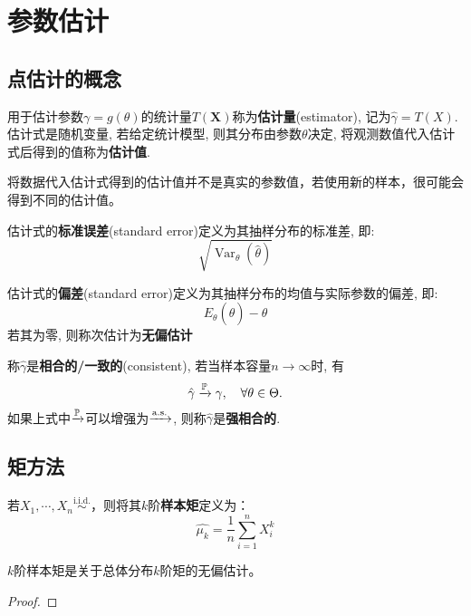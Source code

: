 \chapter{参数估计}

\section{点估计的概念}

\begin{definition}[点估计]
    用于估计参数$\gamma = g(\theta)$的统计量$T(\mathbf{X})$称为\textbf{估计量}(estimator), 记为$\hat{\gamma} = T(X)$. 估计式是随机变量, 若给定统计模型, 则其分布由参数$\theta$决定, 将观测数值代入估计式后得到的值称为\textbf{估计值}.
\end{definition}

将数据代入估计式得到的估计值并不是真实的参数值，若使用新的样本，很可能会得到不同的估计值。

\begin{definition}[标准误差]
    估计式的\textbf{标准误差}(standard error)定义为其抽样分布的标准差, 即:
    \[ \sqrt{\operatorname{Var}_{\theta}(\hat{\theta})} \]
\end{definition}

\begin{definition}[无偏估计]
    估计式的\textbf{偏差}(standard error)定义为其抽样分布的均值与实际参数的偏差, 即:
    \[ E_{\theta}(\hat{\theta})-\theta \]
    若其为零, 则称次估计为\textbf{无偏估计}
\end{definition}

\begin{definition}[相合]
    称$\hat{\gamma}$是\textbf{相合的/一致的}(consistent), 若当样本容量$n\to\infty$时, 有
    \[ \hat{\gamma} \xrightarrow{\P} \gamma, \quad \forall \theta\in\Theta. \]
    如果上式中$\xrightarrow{\P}$可以增强为$\xrightarrow{\as}$, 则称$\hat{\gamma}$是\textbf{强相合的}.
\end{definition}

\section{矩方法}

\begin{definition}[样本矩]
    若$X_1,\cdots ,X_n \overset{\text{i.i.d.}}{\sim}$，则将其$k$阶\textbf{样本矩}定义为：
    \[ \hat{\mu_k}=\frac{1}{n}\sum_{i=1}^n X_i^k\]
\end{definition}

\begin{proposition}
    $k$阶样本矩是关于总体分布$k$阶矩的无偏估计。
\end{proposition}
\begin{proof}

\end{proof}

